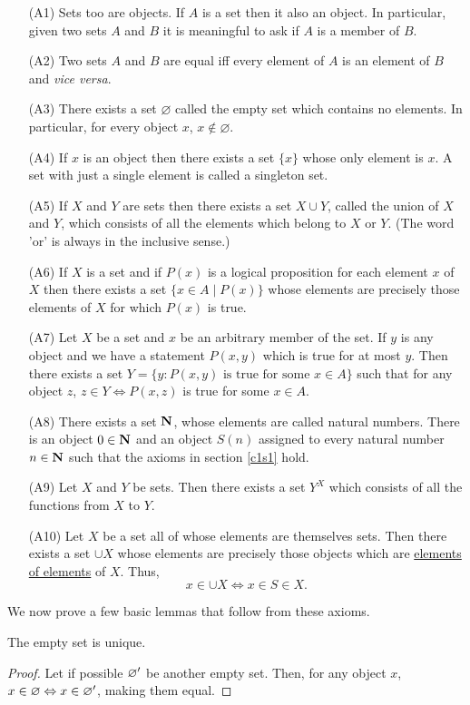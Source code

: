\begin{enumerate}
\item[(A1)] Sets too are objects. If $A$ is a set then it also an object.
In particular, given two sets $A$ and $B$ it is meaningful to ask if $A$
is a member of $B$.
\item[(A2)] Two sets $A$ and $B$ are equal iff every element of $A$ is an
element of $B$ and \emph{vice versa}.
\item[(A3)] There exists a set $\varnothing$ called the empty set which
contains no elements. In particular, for every object $x$, $x \notin 
\varnothing$.
\item[(A4)] If $x$ is an object then there exists a set $\{x\}$ whose only
element is $x$. A set with just a single element is called a singleton set. 
\item[(A5)] If $X$ and $Y$ are sets then there exists a set $X \cup Y$, 
called the union of $X$ and $Y$, which consists of all the elements which
belong to $X$ or $Y$. (The word 'or' is always in the inclusive sense.)
\item[(A6)] If $X$ is a set and if $P(x)$ is a logical proposition for 
each element $x$ of $X$ then there exists a set $\{x \in A \;|\; P(x)\}$
whose elements are precisely those elements of $X$ for which $P(x)$ is 
true.
\item[(A7)] Let $X$ be a set and $x$ be an arbitrary member of the set.
If $y$ is any object and we have a statement $P(x, y)$ which is true for
at most $y$. Then there exists a set $Y = \{y: P(x, y) \text{ is true for 
some } x \in A\}$ such that for any object $z$, $z \in Y \Leftrightarrow
P(x, z)$ is true for some $x \in A$.
\item[(A8)] There exists a set $\mathbf{N}$, whose elements are called natural
numbers. There is an object $0 \in \mathbf{N}$ and an object $S(n)$ assigned to
every natural number $n \in \mathbf{N}$ such that the axioms in section 
\ref{c1s1} hold.
\item[(A9)] Let $X$ and $Y$ be sets. Then there exists a set $Y^{X}$ which
consists of all the functions from $X$ to $Y$.
\item[(A10)] Let $X$ be a set all of whose elements are themselves sets.
Then there exists a set $\cup X$ whose elements are precisely those objects
which are \underline{elements of elements} of $X$. Thus,
\[
x \in \cup X \Leftrightarrow x \in S \in X.
\]
\end{enumerate}

We now prove a few basic lemmas that follow from these axioms.
\begin{lem}\label{c2s1l1}
The empty set is unique.
\end{lem}
\begin{proof}
Let if possible $\varnothing^\prime$ be another empty set. Then, for any 
object $x$, $x \in \varnothing \Leftrightarrow x \in \varnothing^\prime$,
making them equal.
\end{proof}


